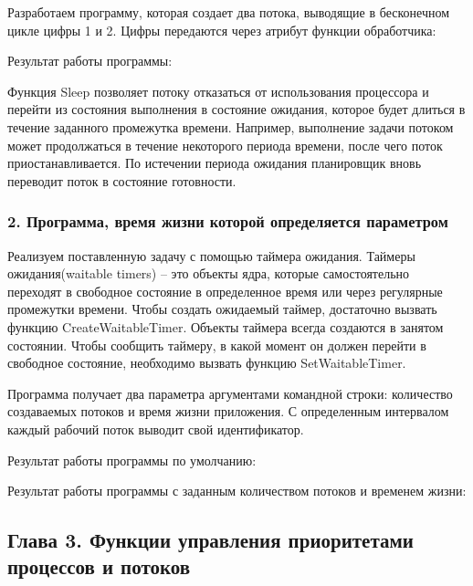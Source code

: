 \documentclass[14pt,a4paper,report]{report}
\begin{document}
Разработаем программу, которая создает два потока, выводящие в бесконечном цикле цифры 1 и 2. Цифры передаются через атрибут функции обработчика: 



Результат работы программы:



Функция Sleep позволяет потоку отказаться от использования процессора и перейти из состояния выполнения в состояние ожидания, которое будет длиться в течение заданного промежутка времени. Например, выполнение задачи потоком может продолжаться в течение некоторого периода времени, после чего поток приостанавливается. По истечении периода ожидания планировщик вновь переводит поток в состояние готовности.

\subsubsection{2. Программа, время жизни которой определяется параметром}

Реализуем поставленную задачу с помощью таймера ожидания. Таймеры ожидания(waitable timers) – это объекты ядра, которые самостоятельно переходят в свободное состояние в определенное время или через регулярные промежутки времени. Чтобы создать ожидаемый таймер, достаточно вызвать функцию CreateWaitableTimer. Объекты таймера всегда создаются в занятом состоянии. Чтобы сообщить таймеру, в какой момент он должен перейти в свободное состояние, необходимо вызвать функцию SetWaitableTimer. 

Программа получает два параметра аргументами командной строки: количество создаваемых потоков и время жизни приложения. С определенным интервалом каждый рабочий поток выводит свой идентификатор.



Результат работы программы по умолчанию:



Результат работы программы с заданным количеством потоков и временем жизни:



\subsection{Глава 3. Функции управления приоритетами процессов и потоков}
\end{document}
